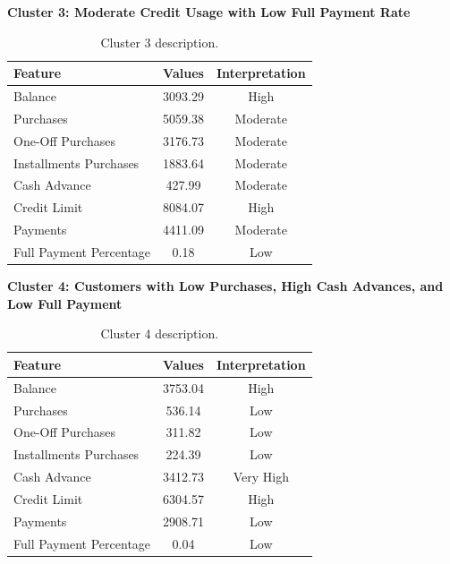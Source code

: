 \begin{center}
\centering
\textbf{Cluster 3: Moderate Credit Usage with Low Full Payment Rate}
\begin{table}[H]
\centering
\begin{tabular}{|l|c|c|}
\hline
\textbf{Feature} & \textbf{Values} & \textbf{Interpretation} \\ \hline
Balance & 3093.29 & High \\ \hline
Purchases & 5059.38 & Moderate \\ \hline
One-Off Purchases & 3176.73 & Moderate \\ \hline
Installments Purchases & 1883.64 & Moderate \\ \hline
Cash Advance & 427.99 & Moderate \\ \hline
Credit Limit & 8084.07 & High \\ \hline
Payments & 4411.09 & Moderate \\ \hline
Full Payment Percentage & 0.18 & Low \\ \hline
\end{tabular}
\caption{Cluster 3 description.}
\end{table}

\centering
\textbf{Cluster 4: Customers with Low Purchases, High Cash Advances, and Low Full Payment}
\begin{table}[H]
\centering
\begin{tabular}{|l|c|c|}
\hline
\textbf{Feature} & \textbf{Values} & \textbf{Interpretation} \\ \hline
Balance & 3753.04 & High \\ \hline
Purchases & 536.14 & Low \\ \hline
One-Off Purchases & 311.82 & Low \\ \hline
Installments Purchases & 224.39 & Low \\ \hline
Cash Advance & 3412.73 & Very High \\ \hline
Credit Limit & 6304.57 & High \\ \hline
Payments & 2908.71 & Low \\ \hline
Full Payment Percentage & 0.04 & Low \\ \hline
\end{tabular}
\caption{Cluster 4 description.}
\end{table}


\end{center}
